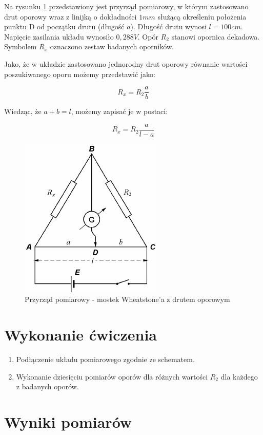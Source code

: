 \documentclass[a4paper,10pt,twoside]{article}
\begin{document}
Na rysunku \ref{fig:uklad} przedstawiony jest przyrząd pomiarowy, w którym zastosowano drut oporowy wraz z linijką o dokładności $1 \unit{mm}$ służącą określeniu położenia punktu D od początku drutu (długość $a$). Długość drutu wynosi $l = 100 \unit{cm}$. Napięcie zasilania układu wynosiło $0,288 \unit{V}$. Opór $R_2$ stanowi opornica dekadowa. Symbolem $R_x$ oznaczono zestaw badanych oporników.

Jako, że w układzie zastosowano jednorodny drut oporowy równanie wartości poszukiwanego oporu możemy przedstawić jako:

$$ R_x = R_2\frac{a}{b} $$

Wiedząc, że $a + b = l$, możemy zapisać je w postaci:

$$ R_x = R_2\frac{a}{l - a} $$

\begin{figure}[!htp]
\centerline{\includegraphics[scale=0.5]{uklad.png}}
\caption{Przyrząd pomiarowy - mostek Wheatstone'a z drutem oporowym}
\label{fig:uklad}
\end{figure}

\section{Wykonanie ćwiczenia}

\begin{enumerate}
  \item Podłączenie układu pomiarowego zgodnie ze schematem.
  \item Wykonanie dziesięciu pomiarów oporów dla różnych wartości $R_2$ dla każdego z badanych oporów.
\end{enumerate}

\newpage

\section{Wyniki pomiarów}
\end{document}
